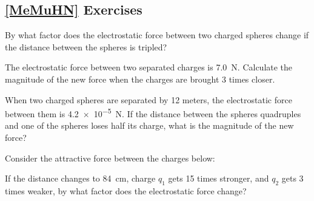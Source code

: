\documentclass[main.tex]{subfiles}
\begin{document}
\subsection*{\ref{MeMuHN} Exercises}

\begin{exercise} \label{WFMudS}
    By what factor does the electrostatic force between two charged spheres change if the distance between the spheres is tripled?
\end{exercise}

\begin{exercise} \label{t77ZZC}
    The electrostatic force between two separated charges is \SI{7.0}{N}. Calculate the magnitude of the new force when the charges are brought 3 times closer. 
\end{exercise}

\begin{exercise} \label{yCR62E}
    When two charged spheres are separated by 12 meters, the electrostatic force between them is \SI{4.2e-5}{N}. If the distance between the spheres quadruples and one of the spheres loses half its charge, what is the magnitude of the new force?
\end{exercise}

\begin{exercise} \label{y5ONvE}
    Consider the attractive force between the charges below:

\begin{center}
\end{center}

If the distance changes to \SI{84}{cm}, charge $q_1$ gets 15 times stronger, and $q_2$ gets 3 times weaker, by what factor does the electrostatic force change?
\end{exercise}
\end{document}
